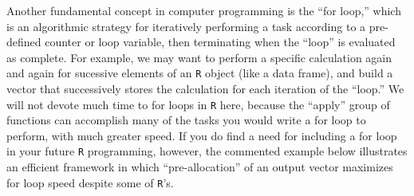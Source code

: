 \documentclass[]{book}
\newenvironment{Shaded}{\begin{snugshade}}{\end{snugshade}}
\newcommand{\CommentTok}[1]{\textcolor[rgb]{0.56,0.35,0.01}{\textit{#1}}}
\newcommand{\ControlFlowTok}[1]{\textcolor[rgb]{0.13,0.29,0.53}{\textbf{#1}}}
\newcommand{\DecValTok}[1]{\textcolor[rgb]{0.00,0.00,0.81}{#1}}
\newcommand{\KeywordTok}[1]{\textcolor[rgb]{0.13,0.29,0.53}{\textbf{#1}}}
\newcommand{\NormalTok}[1]{#1}
\newcommand{\OperatorTok}[1]{\textcolor[rgb]{0.81,0.36,0.00}{\textbf{#1}}}
\newcommand{\OtherTok}[1]{\textcolor[rgb]{0.56,0.35,0.01}{#1}}
\newcommand{\StringTok}[1]{\textcolor[rgb]{0.31,0.60,0.02}{#1}}
\begin{document}
Another fundamental concept in computer programming is the ``for loop,'' which is an algorithmic strategy for iteratively performing a task according to a pre-defined counter or loop variable, then terminating when the ``loop'' is evaluated as complete. For example, we may want to perform a specific calculation again and again for sucessive elements of an \texttt{R} object (like a data frame), and build a vector that successively stores the calculation for each iteration of the ``loop.'' We will not devote much time to for loops in \texttt{R} here, because the ``apply'' group of functions can accomplish many of the tasks you would write a for loop to perform, with much greater speed. If you do find a need for including a for loop in your future \texttt{R} programming, however, the commented example below illustrates an efficient framework in which ``pre-allocation'' of an output vector maximizes for loop speed despite some of \texttt{R}'s.

\begin{Shaded}
\end{Shaded}
\end{document}
